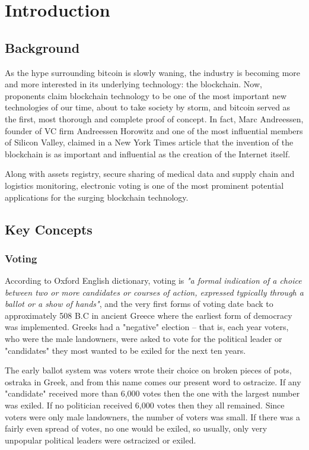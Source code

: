 \chapter{Introduction}
\section{Background}

As the hype surrounding bitcoin\cite{nakamotoBitcoinPeertoPeerElectronic} is slowly waning, the industry is becoming more and more interested in its underlying technology: the blockchain. Now, proponents claim blockchain technology to be one of the most important new technologies of our time, about to take society by storm, and bitcoin served as the first, most thorough and complete proof of concept. In fact, Marc Andreessen, founder of VC firm Andreessen Horowitz and one of the most influential members of Silicon Valley, claimed in a New York Times article that the invention of the blockchain is as important and influential as the creation of the Internet itself\cite{andreessenWhyBitcoinMatters1390323270}.\smallskip

Along with assets registry, secure sharing of medical data and supply chain and logistics monitoring, electronic voting is one of the most prominent potential applications for the surging blockchain technology.

\section{Key Concepts}
\subsection{Voting}

According to Oxford English dictionary, voting is \textit{"a formal indication of a choice between two or more candidates or courses of action, expressed typically through a ballot or a show of hands"}, and the very first forms of voting date back to approximately 508 B.C in ancient Greece where the earliest form of democracy was implemented\cite{HistoryElections}. Greeks had a "negative" election -- that is, each year voters, who were the male landowners, were asked to vote for the political leader or "candidates" they most wanted to be exiled for the next ten years.

The early ballot system was voters wrote their choice on broken pieces of pots, ostraka in Greek, and from this name comes our present word to ostracize. If any "candidate" received more than 6,000 votes then the one with the largest number was exiled. If no politician received 6,000 votes then they all remained. Since voters were only male landowners, the number of voters was small. If there was a fairly even spread of votes, no one would be exiled, so usually, only very unpopular political leaders were ostracized or exiled.


